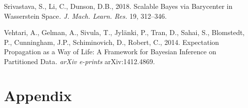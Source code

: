 \documentclass[10pt,a4paper,]{article}
\begin{document}
\hypertarget{ref-srivastava:li:dunson:18}{}
Srivastava, S., Li, C., Dunson, D.B., 2018. Scalable Bayes via
Barycenter in Wasserstein Space\emph{. J. Mach. Learn. Res.} 19,
312--346.

\hypertarget{ref-vehtari:etal:14}{}
Vehtari, A., Gelman, A., Sivula, T., Jylänki, P., Tran, D., Sahai, S.,
Blomstedt, P., Cunningham, J.P., Schiminovich, D., Robert, C., 2014.
Expectation Propagation as a Way of Life: A Framework for Bayesian
Inference on Partitioned Data\emph{. arXiv e-prints} arXiv:1412.4869.

\newpage

\renewcommand{\thesection}{\Alph{section}}

\setcounter{section}{0}

\section{Appendix}\label{appendix}
\end{document}
